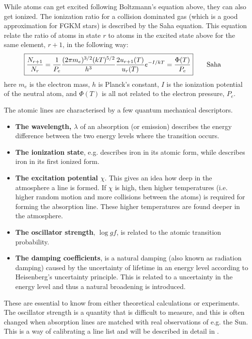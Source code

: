While atoms can get excited following Boltzmann's equation above, they can also get ionized. The
ionization ratio for a collision dominated gas (which is a good approximation for FGKM stars) is
described by the Saha equation. This equation relate the ratio of atoms in state $r$ to atoms in the
excited state above for the same element, $r+1$, in the following way:
\begin{align}
  \Aboxed{ \frac{N_{r+1}}{N_r} = \frac{1}{P_e} \frac{(2\pi m_e)^{3/2}(kT)^{5/2}}{h^3} \frac{2u_{r+1}(T)}{u_r(T)} e^{-I/kT} = \frac{\Phi(T)}{P_e}} \tag*{Saha}
\end{align}
here $m_e$ is the electron mass, $h$ is Planck's constant, $I$ is the ionization potential of the
neutral atom, and $\Phi(T)$ is all not related to the electron pressure, $P_e$.

The atomic lines are characterised by a few quantum mechanical descriptors.
\begin{itemize}
  \item {\bf The wavelength, $\lambda$} of an absorption (or emission) describes the energy
        difference between the two energy levels where the transition occurs.
  \item {\bf The ionization state}, e.g.  describes iron in its atomic form, while
         describes iron in its first ionized form.
  \item {\bf The excitation potential $\chi$}. This gives an idea how deep in the atmosphere a line
        is formed. If $\chi$ is high, then higher temperatures (i.e. higher random motion and more
        collisions between the atoms) is required for forming the absorption line. These higher
        temperatures are found deeper in the atmosphere.
  \item {\bf The oscillator strength}, $\log \mathit{gf}$, is related to the atomic transition
        probability.
  \item {\bf The damping coefficients}, is a natural damping (also known as radiation damping)
        caused by the uncertainty of lifetime in an energy level according to Heisenberg's
        uncertainty principle. This is related to a uncertainty in the energy level and thus a
        natural broadening is introduced.
\end{itemize}
These are essential to know from either theoretical calculations or experiments. The oscillator
strength is a quantity that is difficult to measure, and this is often changed when absorption lines
are matched with real observations of e.g. the Sun. This is a way of calibrating a line list and
will be described in detail in .

